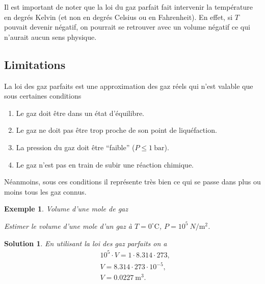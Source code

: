 \documentclass[a4paper,12pt]{book}
\newtheorem*{exemple}{Exemple}
\newtheorem*{solution}{Solution}
\newcommand{\m}{\mathrm{m}}
\newcommand{\C}{\mathrm{C}}
\renewcommand{\bar}{\mathrm{bar}}
\begin{document}
Il est important de noter que la loi du gaz parfait fait intervenir la température en degrés Kelvin (et non en degrés Celsius ou en Fahrenheit). En effet, si $T$ pouvait devenir négatif, on pourrait se retrouver avec un volume négatif ce qui
n'aurait aucun sens physique.

\subsection{Limitations}

La loi des gaz parfaits est une approximation des gaz réels qui n'est valable que 
sous certaines conditions
\begin{enumerate}
\item Le gaz doit être dans un état d'équilibre.
\item Le gaz ne doit pas être trop proche de son point de liquéfaction.
\item La pression du gaz doit être ``faible'' ($P\leq 1\ \bar$).
\item Le gaz n'est pas en train de subir une réaction chimique.
\end{enumerate}
Néanmoins, sous ces conditions il représente très bien ce qui se passe dans plus ou moins tous les gaz connus.

\begin{exemple}{Volume d'une mole de gaz}

Estimer le volume d'une mole d'un gaz à $T=0^\circ\C$, $P=10^5\ N/\m^2$. 
\end{exemple}
\begin{solution}
En utilisant la loi des gaz parfaits on a
\begin{align*}
&10^5\cdot V=1\cdot 8.314\cdot 273,\\
&V=8.314\cdot 273\cdot 10^{-5},\\
&V=0.0227\ \m^3.
\end{align*}
\end{solution}
\end{document}
